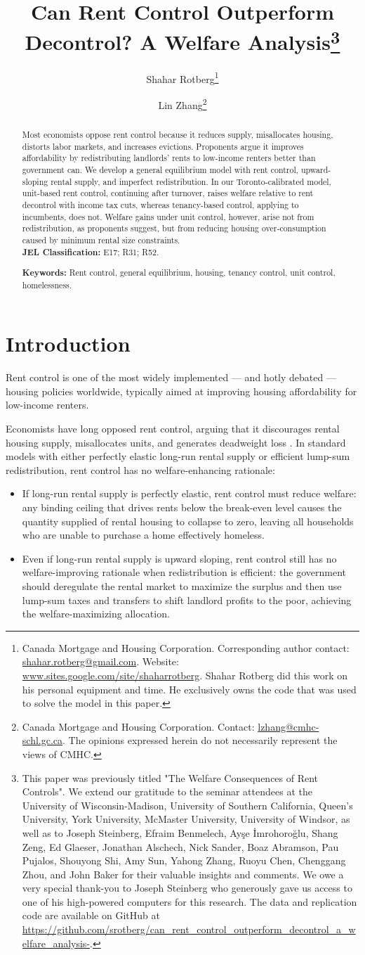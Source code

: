 \documentclass[parskip=full]{article}
\title{\vspace{-1.8cm}Can Rent Control Outperform Decontrol? A Welfare Analysis\footnote{This paper was previously titled "The Welfare Consequences of Rent Controls". We extend our gratitude to the seminar attendees at the University of Wisconsin-Madison, University of Southern California, Queen's University, York University, McMaster University, University of Windsor, as well as to Joseph Steinberg, Efraim Benmelech, Ay\c{s}e \.{I}mrohoro\u{g}lu, Shang Zeng, Ed Glaeser, Jonathan Alschech, Nick Sander, Boaz Abramson, Pau Pujalos, Shouyong Shi, Amy Sun, Yahong Zhang, Ruoyu Chen, Chenggang Zhou, and John Baker for their valuable insights and comments. We owe a very special thank-you to Joseph Steinberg who generously gave us access to one of his high-powered computers for this research. The data and replication code are available on GitHub at \url{https://github.com/srotberg/can_rent_control_outperform_decontrol_a_welfare_analysis-}.}}
\author{Shahar Rotberg\footnote{Canada Mortgage and Housing Corporation. Corresponding author contact: \url{shahar.rotberg@gmail.com}. Website: \url{www.sites.google.com/site/shaharrotberg}. Shahar Rotberg did this work on his personal equipment and time. He exclusively owns the code that was used to solve the model in this paper.} \and Lin Zhang\footnote{Canada Mortgage and Housing Corporation. Contact: \url{lzhang@cmhc-schl.gc.ca}. The opinions expressed herein do not necessarily represent the views of CMHC.}}
\begin{document}
\maketitle

\begin{abstract}
\onehalfspacing

\noindent Most economists oppose rent control because it reduces supply, misallocates housing, distorts labor markets, and increases evictions. Proponents argue it improves affordability by redistributing landlords' rents to low-income renters better than government can. We develop a general equilibrium model with rent control, upward-sloping rental supply, and imperfect redistribution. In our Toronto-calibrated model, unit-based rent control, continuing after turnover, raises welfare relative to rent decontrol with income tax cuts, whereas tenancy-based control, applying to incumbents, does not. Welfare gains under unit control, however, arise not from redistribution, as proponents suggest, but from reducing housing over‑consumption caused by minimum rental size constraints.
\\[1.5ex]

\noindent \textbf{JEL Classification:} E17; R31; R52. 

\noindent \textbf{Keywords:} Rent control, general equilibrium, housing, tenancy control, unit control, homelessness.
\end{abstract}

\section{Introduction}

Rent control is one of the most widely implemented — and hotly debated — housing policies worldwide, typically aimed at improving housing affordability for low-income renters. 

Economists have long opposed rent control, arguing that it discourages rental housing supply, misallocates units, and generates deadweight loss \citep{gl-2003}. In standard models with either perfectly elastic long-run rental supply or efficient lump-sum redistribution, rent control has no welfare-enhancing rationale:

\begin{itemize}
    \item If long-run rental supply is perfectly elastic, rent control must reduce welfare: any binding ceiling that drives rents below the break-even level causes the quantity supplied of rental housing to collapse to zero, leaving all households who are unable to purchase a home effectively homeless.
    \item Even if long-run rental supply is upward sloping, rent control still has no welfare-improving rationale when redistribution is efficient: the government should deregulate the rental market to maximize the surplus and then use lump-sum taxes and transfers to shift landlord profits to the poor, achieving the welfare-maximizing allocation.
\end{itemize}
\end{document}
